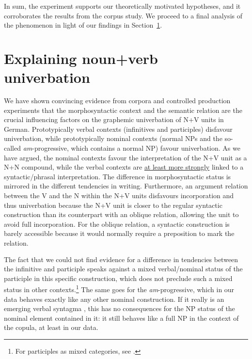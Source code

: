 \documentclass[biblatex, charis, linguex]{glossa}\usepackage{knitr}
\begin{document}
In sum, the experiment supports our theoretically motivated hypotheses, and it corroborates the results from the corpus study.
We proceed to a final analysis of the phenomenon in light of our findings in Section~\ref{sec:explainingnounverbuniverbation}.





\section{Explaining noun+verb univerbation}
\label{sec:explainingnounverbuniverbation}

We have shown convincing evidence from corpora and controlled production experiments that the morphosyntactic context and the semantic relation are the crucial influencing factors on the graphemic univerbation of N+V units in German.
Prototypically verbal contexts (infinitives and participles) disfavour univerbation, while prototypically nominal contexts (normal NPs and the so-called \textit{am}-progressive, which contains a normal NP) favour univerbation.
As we have argued, the nominal contexts favour the interpretation of the N+V unit as a N+N compound, while the verbal contexts are \ul{at least more strongly} linked to a syntactic\slash phrasal interpretation.
The difference in morphosyntactic status is mirrored in the different tendencies in writing.
Furthermore, an argument relation between the V and the N within the N+V units disfavours incorporation and thus univerbation because the N+V unit is closer to the regular syntactic construction than its counterpart with an oblique relation, allowing the unit to avoid full incorporation.
For the oblique relation, a syntactic construction is barely accessible because it would normally require a preposition to mark the relation.

The fact that we could not find evidence for a difference in tendencies between the infinitive and participle speaks against a mixed verbal\slash nominal status of the participle in this specific construction, which does not preclude such a mixed status in other contexts.\footnote{%
For participles as mixed categories, see \citet{BorikGehrke2019}.}
The same goes for the \textit{am}-progressive, which in our data behaves exactly like any other nominal construction.
If it really is an emerging verbal syntagma \citep{AnthonissenEa2016}, this has no consequences for the NP status of the nominal element contained in it: it still behaves like a full NP in the context of the copula, at least in our data.
\end{document}
